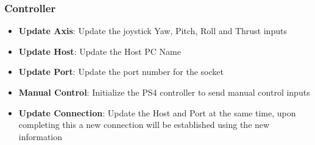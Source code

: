 \subsubsection{Controller}
\begin{itemize}
	\item \textbf{Update Axis}: Update the joystick Yaw, Pitch, Roll and Thrust inputs
	\item \textbf{Update Host}: Update the Host PC Name
	\item \textbf{Update Port}: Update the port number for the socket
	\item \textbf{Manual Control}: Initialize the PS4 controller to send manual control inputs
	\item \textbf{Update Connection}: Update the Host and Port at the same time, upon completing this a new connection will be established using the new information
\end{itemize}
